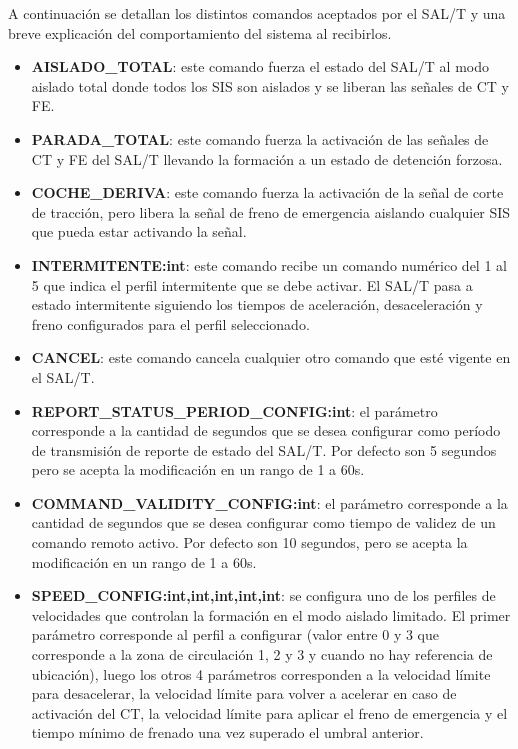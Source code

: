 A continuación se detallan los distintos comandos aceptados por el SAL/T y una breve explicación del comportamiento del sistema al recibirlos. 

\begin{itemize}
    \item \textbf{AISLADO\_TOTAL}: este comando fuerza el estado del SAL/T al modo aislado total donde todos los SIS son aislados y se liberan las señales de CT y FE. 
    
    \item \textbf{PARADA\_TOTAL}: este comando fuerza la activación de las señales de CT y FE del SAL/T llevando la formación a un estado de detención forzosa. 
    
    \item \textbf{COCHE\_DERIVA}: este comando fuerza la activación de la señal de corte de tracción, pero libera la señal de freno de emergencia aislando cualquier SIS que pueda estar activando la señal. 
    
    \item \textbf{INTERMITENTE:int}: este comando recibe un comando numérico del 1 al 5 que indica el perfil intermitente que se debe activar. El SAL/T pasa a estado intermitente siguiendo los tiempos de aceleración, desaceleración y freno configurados para el perfil seleccionado. 

    \item \textbf{CANCEL}: este comando cancela cualquier otro comando que esté vigente en el SAL/T. 
    
    \item \textbf{REPORT\_STATUS\_PERIOD\_CONFIG:int}: el parámetro corresponde a la cantidad de segundos que se desea configurar como período de transmisión de reporte de estado del SAL/T. Por defecto son 5 segundos pero se acepta la modificación en un rango de 1 a 60s. 
    
    \item \textbf{COMMAND\_VALIDITY\_CONFIG:int}: el parámetro corresponde a la cantidad de segundos que se desea configurar como tiempo de validez de un comando remoto activo. Por defecto son 10 segundos, pero se acepta la modificación en un rango de 1 a 60s. 
    
    \item \textbf{SPEED\_CONFIG:int,int,int,int,int}: se configura uno de los perfiles de velocidades que controlan la formación en el modo aislado limitado. El primer parámetro corresponde al perfil a configurar (valor entre 0 y 3 que corresponde a la zona de circulación 1, 2 y 3 y cuando no hay referencia de ubicación), luego los otros 4 parámetros corresponden a la velocidad límite para desacelerar, la velocidad límite para volver a acelerar en caso de activación del CT, la velocidad límite para aplicar el freno de emergencia y el tiempo mínimo de frenado una vez superado el umbral anterior. 
    

\end{itemize}
